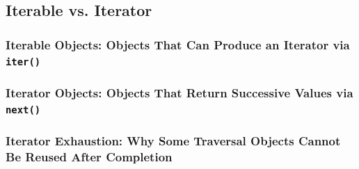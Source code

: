 \subsection{Iterable vs. Iterator}
\subsubsection{Iterable Objects: Objects That Can Produce an Iterator via \texttt{iter()}}
\subsubsection{Iterator Objects: Objects That Return Successive Values via \texttt{next()}}
\subsubsection{Iterator Exhaustion: Why Some Traversal Objects Cannot Be Reused After Completion}
